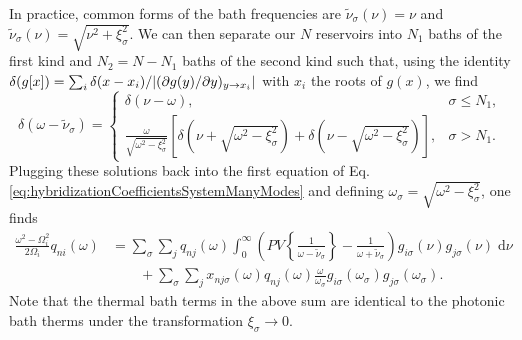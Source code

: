 In practice, common forms of the bath frequencies are $\tilde{\nu}_\sigma(\nu) = \nu$ and $\tilde{\nu}_\sigma(\nu) = \sqrt{\nu^2 + \xi_\sigma^2}$. We can then separate our $N$ reservoirs into $N_1$ baths of the first kind and $N_2 = N - N_1$ baths of the second kind such that, using the identity $\delta(g[x]) = \sum_i\delta(x - x_i)/\abs{(\partial g(y)/\partial y)_{y\to x_i}}$ with $x_i$ the roots of $g(x)$, we find
\begin{equation}
\delta(\omega - \tilde{\nu}_\sigma) =
\begin{cases}
\delta(\nu - \omega), &\sigma\leq N_1,\\
\frac{\omega}{\sqrt{\omega^2 - \xi_\sigma^2}}\left[\delta(\nu + \sqrt{\omega^2 - \xi_\sigma^2}) + \delta(\nu - \sqrt{\omega^2 - \xi_\sigma^2})\right], &\sigma > N_1.
\end{cases}
\end{equation}
Plugging these solutions back into the first equation of Eq. \eqref{eq:hybridizationCoefficientsSystemManyModes} and defining $\omega_\sigma = \sqrt{\omega^2 - \xi_\sigma^2}$, one finds
\begin{equation}
\begin{split}
\frac{\omega^2 - \Omega_i^2}{2\Omega_i}q_{ni}(\omega) &= \sum_\sigma\sum_jq_{nj}(\omega)\int_0^\infty\left(PV\left\{\frac{1}{\omega - \tilde{\nu}_\sigma}\right\} - \frac{1}{\omega + \tilde{\nu}_\sigma}\right)g_{i\sigma}(\nu)g_{j\sigma}(\nu)\;\mathrm{d}\nu\\
&\qquad + \sum_\sigma\sum_j x_{nj\sigma}(\omega)q_{nj}(\omega)\frac{\omega}{\omega_\sigma}g_{i\sigma}(\omega_\sigma)g_{j\sigma}(\omega_\sigma).
\end{split}
\end{equation}
Note that the thermal bath terms in the above sum are identical to the photonic bath therms under the transformation $\xi_\sigma\to0$.

